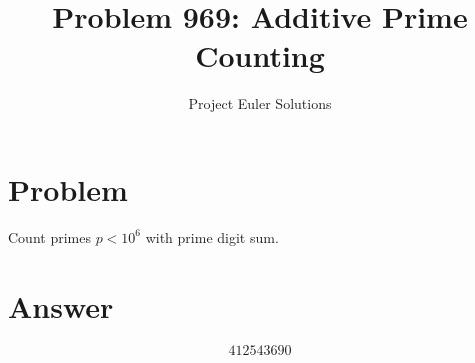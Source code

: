 \documentclass[11pt]{article}
\title{Problem 969: Additive Prime Counting}
\author{Project Euler Solutions}
\date{}
\begin{document}
\maketitle
\section{Problem}
Count primes $p < 10^6$ with prime digit sum.
\section{Answer}

\[
\boxed{412543690}
\]
\end{document}
